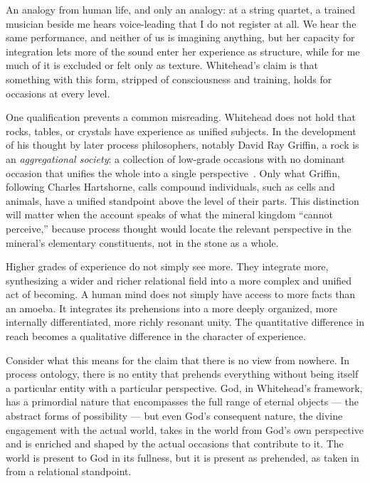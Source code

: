 An analogy from human life, and only an analogy: at a string quartet, a trained musician beside me hears voice-leading that I do not register at all.
We hear the same performance, and neither of us is imagining anything, but her capacity for integration lets more of the sound enter her experience as structure, while for me much of it is excluded or felt only as texture.
Whitehead's claim is that something with this form, stripped of consciousness and training, holds for occasions at every level.

One qualification prevents a common misreading.
Whitehead does not hold that rocks, tables, or crystals have experience as unified subjects.
In the development of his thought by later process philosophers, notably David Ray Griffin, a rock is an \emph{aggregational society}: a collection of low-grade occasions with no dominant occasion that unifies the whole into a single perspective~\citep{Griffin2000}.
Only what Griffin, following Charles Hartshorne, calls compound individuals, such as cells and animals, have a unified standpoint above the level of their parts.
This distinction will matter when the \bahai account speaks of what the mineral kingdom ``cannot perceive,'' because process thought would locate the relevant perspective in the mineral's elementary constituents, not in the stone as a whole.

Higher grades of experience do not simply see more.
They integrate more, synthesizing a wider and richer relational field into a more complex and unified act of becoming.
A human mind does not simply have access to more facts than an amoeba.
It integrates its prehensions into a more deeply organized, more internally differentiated, more richly resonant unity.
The quantitative difference in reach becomes a qualitative difference in the character of experience.

Consider what this means for the claim that there is no view from nowhere.
In process ontology, there is no entity that prehends everything without being itself a particular entity with a particular perspective.
God, in Whitehead's framework, has a primordial nature that encompasses the full range of eternal objects --- the abstract forms of possibility --- but even God's consequent nature, the divine engagement with the actual world, takes in the world from God's own perspective and is enriched and shaped by the actual occasions that contribute to it.
The world is present to God in its fullness, but it is present as prehended, as taken in from a relational standpoint.


